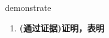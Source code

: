 
\begin{frame}
{\huge demonstrate}
\begin{center}
\begin{enumerate}\Large
  \item \textbf{(通过证据)证明，表明}
\end{enumerate}
\end{center}
\end{frame}
